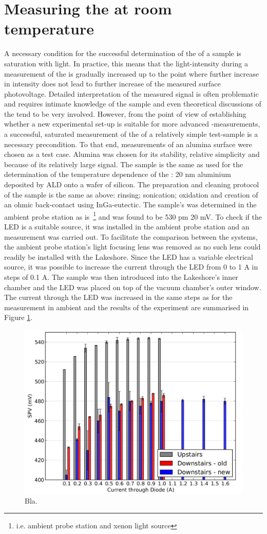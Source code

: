 \section{Measuring the \spv{} at room temperature}
A necessary condition for the successful determination of the \spv{} of a sample is saturation with light. In practice, this means that the light-intensity during a measurement of the \spv{} is gradually increased up to the point where further increase in intensity does not lead to further increase of the measured surface photovoltage. Detailed interpretation of the measured signal is often problematic and requires intimate knowledge of the sample and even theoretical discussions of the \spv{} tend to be very involved. However, from the point of view of establishing whether a new experimental set-up is suitable for more advanced \spv{}-measurements, a successful, saturated measurement of the \spv{} of a relatively simple test-sample is a necessary precondition. To that end, \spv{} measurements of an alumina surface were chosen as a test case. Alumina was chosen for its stability, relative simplicity and because of its relatively large \spv{} signal. The sample is the same as used for the determination of the temperature dependence of the \cpd{}: 20 nm aluminium deposited by ALD onto a wafer of silicon. The preparation and cleaning protocol of the sample is the same as above: rinsing; sonication; oxidation and creation of an ohmic back-contact using InGa-eutectic. The sample's \spv{} was determined in the ambient probe station as is~\footnote{i.e. ambient probe station and xenon light source} and was found to be 530 pm 20 mV. To check if the LED is a suitable source, it was installed in the ambient probe station and an \spv{} measurement was carried out. To facilitate the comparison between the systems, the ambient probe station's light focusing lens was removed as no such lens could readily be installed with the Lakeshore. Since the LED has a variable electrical source, it was possible to increase the current through the LED from 0 to 1 A in steps of 0.1 A. The sample was then introduced into the Lakeshore's inner chamber and the LED was placed on top of the vacuum chamber's outer window. The current through the LED was increased in the same steps as for the measurement in ambient and the results of the experiment are summarised in Figure \ref{fig:Iseries}.
\begin{figure}
\centering
	\includegraphics[width=0.8\linewidth]{./figs/currentseries}
	\caption{Bla.}
	\label{fig:Iseries}
\end{figure}
